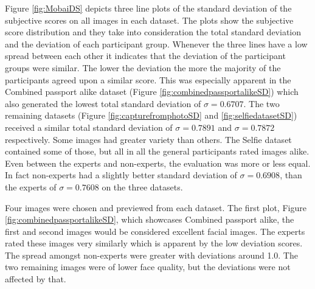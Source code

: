 Figure \ref{fig:MobaiDS} depicts three line plots of the standard deviation of the subjective scores on all images in each dataset. The plots show the subjective score distribution and they take into consideration the total standard deviation and the deviation of each participant group. Whenever the three lines have a low spread between each other it indicates that the deviation of the participant groups were similar. The lower the deviation the more the majority of the participants agreed upon a similar score. This was especially apparent in the Combined passport alike dataset (Figure \ref{fig:combinedpassportalikeSD}) which also generated the lowest total standard deviation of $\sigma = 0.6707$. The two remaining datasets (Figure \ref{fig:capturefromphotoSD} and \ref{fig:selfiedatasetSD}) received a similar total standard deviation of $\sigma = 0.7891$ and $\sigma = 0.7872$ respectively. Some images had greater variety than others. The Selfie dataset contained some of those, but all in all the general participants rated images alike. Even between the experts and non-experts, the evaluation was more or less equal. In fact non-experts had a slightly better standard deviation of $\sigma = 0.6908$, than the experts of $\sigma = 0.7608$ on the three datasets. 

Four images were chosen and previewed from each dataset. The first plot, Figure \ref{fig:combinedpassportalikeSD}, which showcases Combined passport alike, the first and second images would be considered excellent facial images. The experts rated these images very similarly which is apparent by the low deviation scores. The spread amongst non-experts were greater with deviations around 1.0. The two remaining images were of lower face quality, but the deviations were not affected by that.  


